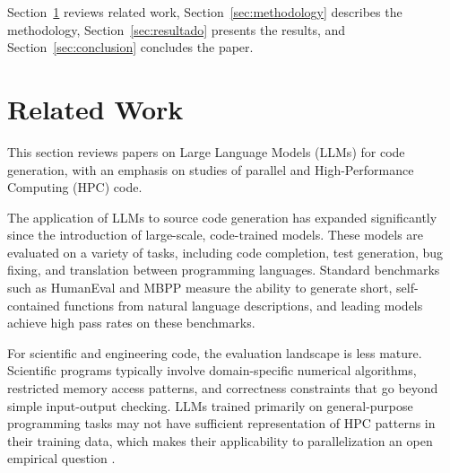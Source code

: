 \documentclass[conference]{IEEEtran}
\begin{document}
Section~\ref{sec:trabalhos} reviews related work, Section~\ref{sec:methodology} describes the methodology, Section~\ref{sec:resultado} presents the results, and Section~\ref{sec:conclusion} concludes the paper.



\section{Related Work}\label{sec:trabalhos}

This section reviews papers on Large Language Models (LLMs) for code generation, with an emphasis on studies of parallel and High-Performance Computing (HPC) code. 


The application of LLMs to source code generation has expanded significantly since the introduction of large-scale, code-trained models. 
These models are evaluated on a variety of tasks, including code completion, test generation, bug fixing, and translation between programming languages. 
Standard benchmarks such as HumanEval \cite{chen2021codex} and MBPP \cite{austin2021mbpp} measure the ability to generate short, self-contained functions from natural language descriptions, and leading models achieve high pass rates on these benchmarks.

For scientific and engineering code, the evaluation landscape is less mature. 
Scientific programs typically involve domain-specific numerical algorithms, restricted memory access patterns, and correctness constraints that go beyond simple input-output checking. 
LLMs trained primarily on general-purpose programming tasks may not have sufficient representation of HPC patterns in their training data, which makes their applicability to %
parallelization an open empirical question \cite{chen2023lm4hpc}.
\end{document}

